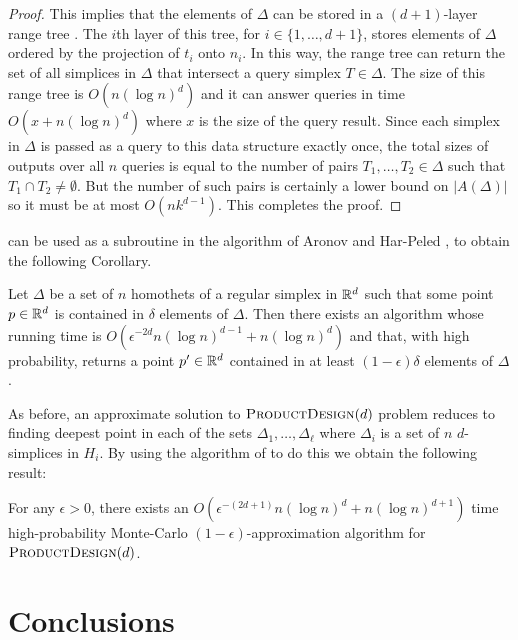 \documentclass[lotsofwhite]{patmorin}
\newcommand{\eps}{\epsilon}
\begin{document}
\begin{proof}
  This implies that the elements of $\Delta$ can be stored in a
  $(d+1)$-layer range tree \cite{b75}.  The $i$th layer of this tree,
  for $i\in\{1,\ldots,d+1\}$, stores elements of $\Delta$ ordered by
  the projection of $t_i$ onto $n_i$.  In this way, the range tree can
  return the set of all simplices in $\Delta$ that intersect a query
  simplex $T\in\Delta$.  The size of this range tree is $O(n(\log
  n)^{d})$ and it can answer queries in time $O(x+n(\log n)^{d})$
  where $x$ is the size of the query result.  Since each simplex in
  $\Delta$ is passed as a query to this data structure exactly once, the
  total sizes of outputs over all $n$ queries is equal to the number of
  pairs $T_1,\ldots,T_2\in\Delta$ such that $T_1\cap T_2\neq\emptyset$.
  But the number of such pairs is certainly a lower bound on $|A(\Delta)|$
  so it must be at most $O(nk^{d-1})$.  This completes the proof.
\end{proof}

 can be used as a subroutine in the
algorithm of Aronov and Har-Peled \cite[Theorem~3.3]{ah08}, to obtain
the following Corollary.

\begin{cor}
  Let $\Delta$ be a set of $n$ homothets of a regular simplex in $\mathbb{R}^d$
  such that some point $p\in\mathbb{R}^d$ is contained in $\delta$ elements
  of $\Delta$.  Then there exists an algorithm whose running time is
  $O(\eps^{-2d}n(\log n)^{d-1} + n(\log n)^d)$ and that, with high
  probability, returns a point $p'\in\mathbb{R}^{d}$ contained in at least
  $(1-\eps)\delta$ elements of $\Delta$.
\end{cor}

As before, an approximate solution to $\textsc{ProductDesign}(d)$ problem
reduces to finding deepest point in each of the sets
$\Delta_1,\ldots,\Delta_\ell$ where $\Delta_i$ is a set of $n$
$d$-simplices in $H_i$.  By using the algorithm of  to
do this we obtain the following result:

\begin{thm}
  For any $\eps >0$, there exists an $O(\eps^{-(2d+1)}n(\log n)^d + n(\log
  n)^{d+1})$ time high-probability Monte-Carlo $(1-\eps)$-approximation
  algorithm for $\textsc{ProductDesign}(d)$.
\end{thm}

\section{Conclusions}
\end{document}
